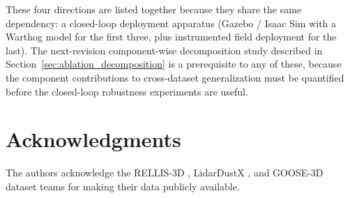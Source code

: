 \documentclass[sensors,article,submit,pdftex,moreauthors]{Definitions/mdpi}
\begin{document}
These four directions are listed together because they share the same dependency: a closed-loop deployment apparatus (Gazebo / Isaac Sim with a Warthog model for the first three, plus instrumented field deployment for the last). The next-revision component-wise decomposition study described in Section~\ref{sec:ablation_decomposition} is a prerequisite to any of these, because the component contributions to cross-dataset generalization must be quantified before the closed-loop robustness experiments are useful.

\section*{Acknowledgments}
The authors acknowledge the RELLIS-3D \cite{jiang2021}, LidarDustX \cite{lidardust}, and GOOSE-3D \cite{goose2024} dataset teams for making their data publicly available.

\end{document}
